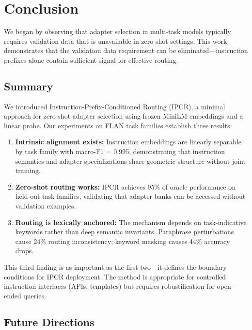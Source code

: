 \section{Conclusion}
\label{sec:conclusion}

We began by observing that adapter selection in multi-task models typically requires validation data that is unavailable in zero-shot settings. This work demonstrates that the validation data requirement can be eliminated---instruction prefixes alone contain sufficient signal for effective routing.

\subsection{Summary}

We introduced Instruction-Prefix-Conditioned Routing (IPCR), a minimal approach for zero-shot adapter selection using frozen MiniLM embeddings and a linear probe. Our experiments on FLAN task families establish three results:

\begin{enumerate}
    \item \textbf{Intrinsic alignment exists:} Instruction embeddings are linearly separable by task family with macro-F1 = 0.995, demonstrating that instruction semantics and adapter specializations share geometric structure without joint training.

    \item \textbf{Zero-shot routing works:} IPCR achieves 95\% of oracle performance on held-out task families, validating that adapter banks can be accessed without validation examples.

    \item \textbf{Routing is lexically anchored:} The mechanism depends on task-indicative keywords rather than deep semantic invariants. Paraphrase perturbations cause 24\% routing inconsistency; keyword masking causes 44\% accuracy drops.
\end{enumerate}

This third finding is as important as the first two---it defines the boundary conditions for IPCR deployment. The method is appropriate for controlled instruction interfaces (APIs, templates) but requires robustification for open-ended queries.

\subsection{Future Directions}


